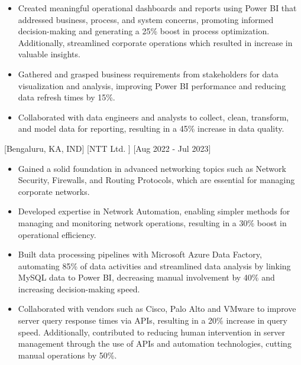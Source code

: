 \documentclass{article}
\begin{document}
\begin{itemize}
\item  Created meaningful operational dashboards and reports using Power BI that addressed business, process, and system concerns, promoting informed decision-making and generating a 25\% boost in process optimization. Additionally, streamlined corporate operations which resulted in increase in valuable insights.

\item  Gathered and grasped business requirements from stakeholders for data visualization and analysis, improving Power BI performance and reducing data refresh times by 15\%.

\item  Collaborated with data engineers and analysts to collect, clean, transform, and model data for reporting, resulting in a 45\% increase in data quality.

\end{itemize}


[Bengaluru, KA, IND]
[NTT Ltd. ] [\normalfont Aug 2022 - Jul 2023]
\begin{itemize}
\item Gained a solid foundation in advanced networking topics such as Network Security, Firewalls, and Routing Protocols, which are essential for managing corporate networks.
\item Developed expertise in Network Automation, enabling simpler methods for managing and monitoring network operations, resulting in a 30\% boost in operational efficiency.
\item Built data processing pipelines with Microsoft Azure Data Factory, automating 85\% of data activities and streamlined data analysis by linking MySQL data to Power BI, decreasing manual involvement by 40\% and increasing decision-making speed.
\item Collaborated with vendors such as Cisco, Palo Alto and VMware to improve server query response times via APIs, resulting in a 20\% increase in query speed. Additionally, contributed to reducing human intervention in server management through the use of APIs and automation technologies, cutting manual operations by 50\%.
\end{itemize}
\end{document}
